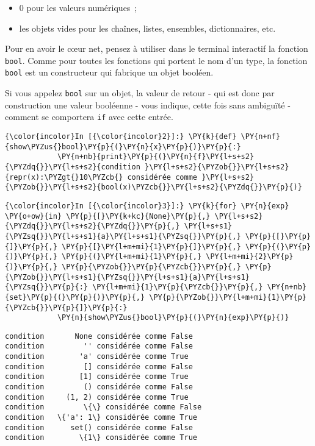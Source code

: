 \begin{itemize}
\tightlist
\item
  0 pour les valeurs numériques~;
\item
  les objets vides pour les chaînes, listes, ensembles, dictionnaires,
  etc.
\end{itemize}

    Pour en avoir le cœur net, pensez à utiliser dans le terminal interactif
la fonction \texttt{bool}. Comme pour toutes les fonctions qui portent
le nom d'un type, la fonction \texttt{bool} est un constructeur qui
fabrique un objet booléen.

Si vous appelez \texttt{bool} sur un objet, la valeur de retour - qui
est donc par construction une valeur booléenne - vous indique, cette
fois sans ambiguïté - comment se comportera \texttt{if} avec cette
entrée.

    \begin{Verbatim}[commandchars=\\\{\}]
{\color{incolor}In [{\color{incolor}2}]:} \PY{k}{def} \PY{n+nf}{show\PYZus{}bool}\PY{p}{(}\PY{n}{x}\PY{p}{)}\PY{p}{:}
            \PY{n+nb}{print}\PY{p}{(}\PY{n}{f}\PY{l+s+s2}{\PYZdq{}}\PY{l+s+s2}{condition }\PY{l+s+s2}{\PYZob{}}\PY{l+s+s2}{repr(x):\PYZgt{}10\PYZcb{} considérée comme }\PY{l+s+s2}{\PYZob{}}\PY{l+s+s2}{bool(x)\PYZcb{}}\PY{l+s+s2}{\PYZdq{}}\PY{p}{)}
\end{Verbatim}


    \begin{Verbatim}[commandchars=\\\{\}]
{\color{incolor}In [{\color{incolor}3}]:} \PY{k}{for} \PY{n}{exp} \PY{o+ow}{in} \PY{p}{[}\PY{k+kc}{None}\PY{p}{,} \PY{l+s+s2}{\PYZdq{}}\PY{l+s+s2}{\PYZdq{}}\PY{p}{,} \PY{l+s+s1}{\PYZsq{}}\PY{l+s+s1}{a}\PY{l+s+s1}{\PYZsq{}}\PY{p}{,} \PY{p}{[}\PY{p}{]}\PY{p}{,} \PY{p}{[}\PY{l+m+mi}{1}\PY{p}{]}\PY{p}{,} \PY{p}{(}\PY{p}{)}\PY{p}{,} \PY{p}{(}\PY{l+m+mi}{1}\PY{p}{,} \PY{l+m+mi}{2}\PY{p}{)}\PY{p}{,} \PY{p}{\PYZob{}}\PY{p}{\PYZcb{}}\PY{p}{,} \PY{p}{\PYZob{}}\PY{l+s+s1}{\PYZsq{}}\PY{l+s+s1}{a}\PY{l+s+s1}{\PYZsq{}}\PY{p}{:} \PY{l+m+mi}{1}\PY{p}{\PYZcb{}}\PY{p}{,} \PY{n+nb}{set}\PY{p}{(}\PY{p}{)}\PY{p}{,} \PY{p}{\PYZob{}}\PY{l+m+mi}{1}\PY{p}{\PYZcb{}}\PY{p}{]}\PY{p}{:}
            \PY{n}{show\PYZus{}bool}\PY{p}{(}\PY{n}{exp}\PY{p}{)}
\end{Verbatim}


    \begin{Verbatim}[commandchars=\\\{\}]
condition       None considérée comme False
condition         '' considérée comme False
condition        'a' considérée comme True
condition         [] considérée comme False
condition        [1] considérée comme True
condition         () considérée comme False
condition     (1, 2) considérée comme True
condition         \{\} considérée comme False
condition   \{'a': 1\} considérée comme True
condition      set() considérée comme False
condition        \{1\} considérée comme True

    \end{Verbatim}

